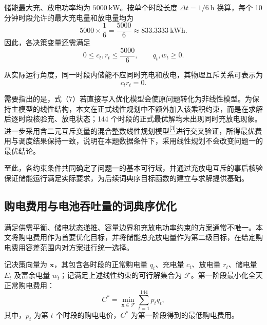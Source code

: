 \documentclass[12pt,a4paper]{ctexart}
\newcommand{\papercite}[1]{\hyperref[ref:#1]{\textsuperscript{[#1]}}}
\begin{document}
\par\noindent 储能最大充、放电功率均为 $5000\ \mathrm{kW}$。按单个时段长度 $\Delta t=1/6\ \mathrm{h}$ 换算，每个 10 分钟时段允许的最大充电量和放电量均为
\begin{equation*}
5000\times\frac{1}{6}=\frac{5000}{6}\approx833.3333\ \mathrm{kWh}.
\end{equation*}
因此，各决策变量还需满足
\begin{equation}
0\leq c_t,r_t\leq\frac{5000}{6},\qquad q_t,w_t\geq0.
\end{equation}

\par\noindent 从实际运行角度，同一时段内储能不应同时充电和放电，其物理互斥关系可表示为
\begin{equation}
c_t r_t=0.
\end{equation}

\par\noindent 需要指出的是，式（7）若直接写入优化模型会使原问题转化为非线性模型。为保持主模型的线性结构，本文在正式线性规划中不额外加入该乘积约束，而是在求解后逐时段核验充、放电状态；144 个时段的正式最优解均未出现同时充放电现象。进一步采用含二元互斥变量的混合整数线性规划模型\papercite{3}进行交叉验证，所得最优费用与调度结果保持一致，说明在本题数据条件下，采用线性规划不会改变问题一的最优结论。

\par\noindent\hspace*{2em}至此，各约束条件共同确定了问题一的基本可行域，并通过充放电互斥的事后核验保证储能运行满足实际要求，为后续词典序目标函数的建立与求解提供基础。
\subsection{购电费用与电池吞吐量的词典序优化}
满足供需平衡、储电状态递推、容量边界和充放电功率约束的方案通常不唯一。本文将购电费用作为首要优化目标，并将储能总充放电量作为第二级目标，在给定购电费用容差范围内对方案进行统一选择。

\par\noindent\hspace*{2em}记决策向量为 $\boldsymbol{x}$，其包含各时段的正常购电量 $q_t$、充电量 $c_t$、放电量 $r_t$、储电量 $E_t$ 及富余电量 $w_t$；记满足上述线性约束的可行解集合为 $\mathcal{F}$。第一阶段最小化全天正常购电费用：
\begin{equation}
C^{*}=\min_{\boldsymbol{x}\in\mathcal{F}}\sum_{t=1}^{144}p_tq_t,
\end{equation}
其中，$p_t$ 为第 $t$ 个时段的购电电价，$C^{*}$ 为第一阶段得到的最低购电费用。
\end{document}
